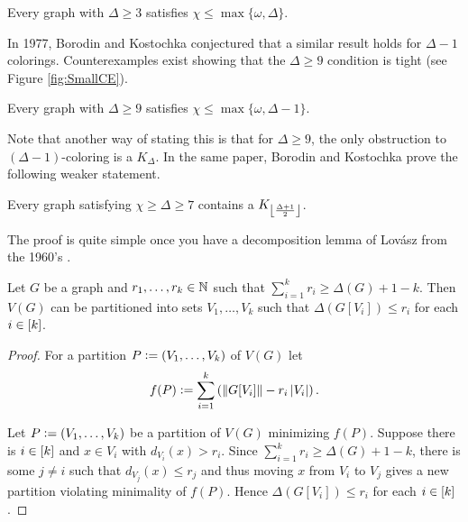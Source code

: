 \begin{thm}
Every graph with $\Delta \geq 3$ satisfies $\chi \leq \max\{\omega, \Delta\}$.
\end{thm}

In 1977, Borodin and Kostochka conjectured that a similar result holds for $\Delta - 1$ colorings.  Counterexamples exist showing that the $\Delta \geq 9$ condition is tight (see Figure \ref{fig:SmallCE}).
\bigskip

\begin{conjecture}
Every graph with $\Delta \geq 9$ satisfies $\chi \leq \max\{\omega, \Delta - 1\}$.
\end{conjecture}

Note that another way of stating this is that for $\Delta \geq 9$, the only obstruction to $(\Delta-1)$-coloring is a $K_\Delta$. In the same paper, Borodin and Kostochka prove the following weaker statement.

\begin{thm}\label{BorodinKostochkaBK}
Every graph satisfying $\chi \geq \Delta \geq 7$ contains a $K_{\left\lfloor\frac{\Delta + 1}{2}\right\rfloor}$.
\end{thm}

The proof is quite simple once you have a decomposition lemma of Lov\'{a}sz from the 1960's \cite{lovasz1966decomposition}.

\begin{lem}\label{LovaszDecomposition} Let $G$ be a graph and $r_1, \ldots, r_k \in \mathbb{N}$ such that $\sum_{i=1}^k r_i \geq \Delta(G) + 1 - k$. 
Then $V(G)$ can be partitioned into sets $V_1, \ldots, V_k$ such that $\Delta(G[V_i]) \leq r_i$ for each $i \in \left[k\right]$.
\end{lem}
\begin{proof}
For a partition $P \mathrel{\mathop:}= \left( V_1, \ldots, V_k \right)$ of $V(G)$ let
			\[f(P) \mathrel{\mathop:}= \sum_{i=1}^k \left( \left\Vert G[V_i]\right\Vert - r_i\left|V_i\right| \right).\]

\noindent Let $P \mathrel{\mathop:}= \left( V_1, \ldots, V_k \right)$ be a partition of $V(G)$
minimizing $f(P)$.  Suppose there is $i \in \left[k\right]$ and $x \in V_i$ with
$d_{V_i}(x) > r_i$. Since $\sum_{i=1}^k r_i \geq \Delta(G) + 1 - k$, there is
some $j \neq i$ such that $d_{V_j}(x) \leq r_j$ and thus moving $x$ from $V_i$ to
$V_j$ gives a new partition violating minimality of $f(P)$.  Hence
$\Delta(G[V_i]) \leq r_i$ for each $i \in \left[k\right]$.
\end{proof}


